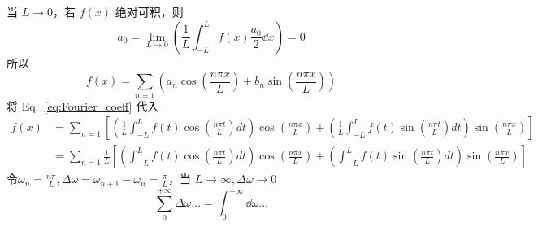当 \(L \to 0\)，若 \(f(x)\) 绝对可积，则
\begin{equation*}
	a_0 = \lim_{L \to 0}
	\left(	\frac{1}{L} \int_{-L}^{L} f(x) \frac{a_0}{2} \dd x \right)= 0
\end{equation*}
所以
\begin{equation*}
	f(x) =
	\sum_{n=1}
	\left(
	a_n \cos(\frac{n \pi x}{L})  +
	b_n \sin(\frac{n \pi x}{L})
	\right)
\end{equation*}
将 Eq.~\eqref{eq:Fourier_coeff} 代入
\begin{equation*}
	\begin{aligned}
		f(x) & =
		\sum_{n=1}
		\left[
			\left(
			\frac{1}{L} \int_{-L}^{L}  f(t) \cos(\frac{n \pi t}{L}) d t
			\right)
			\cos(\frac{n \pi x}{L})  +
			\left(\frac{1}{L} \int_{-L}^{L}  f(t) \sin(\frac{n \pi t}{L}) d t \right)
			\sin(\frac{n \pi x}{L})
		\right]  \\
		     & =
		\sum_{n=1}
		\frac{1}{L}\left[
			\left(
			\int_{-L}^{L}  f(t) \cos(\frac{n \pi t}{L}) d t
			\right)
			\cos(\frac{n \pi x}{L})  +
			\left( \int_{-L}^{L}  f(t) \sin(\frac{n \pi t}{L}) d t \right)
			\sin(\frac{n \pi x}{L})
			\right]
	\end{aligned}
\end{equation*}
令\( \omega_n = \frac{n \pi}{L}, \Delta \omega = \omega_{n+1} - \omega_n = \frac{\pi}{L}\)，当 \(L \to \infty, \Delta \omega \to 0\)
\begin{equation*}
	\sum_0^{+\infty} \Delta \omega \ldots
	=
	\int_0^{+\infty} \dd \omega \ldots
\end{equation*}
